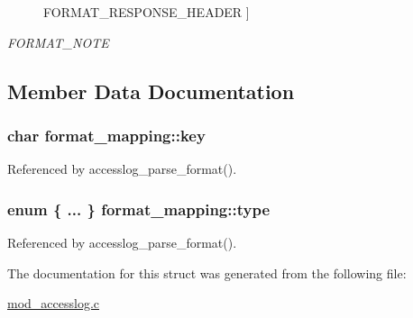 \begin{Desc}
\begin{description}
{\hypertarget{structformat__mapping_a64140d7a8e9af45156f6c4e81dabb506ab54f484250853187c8c5c251df0b1337}{F\-O\-R\-M\-A\-T\-\_\-\-R\-E\-S\-P\-O\-N\-S\-E\-\_\-\-H\-E\-A\-D\-E\-R}\label{structformat__mapping_a64140d7a8e9af45156f6c4e81dabb506ab54f484250853187c8c5c251df0b1337}
}]\item[{\em 
\hypertarget{structformat__mapping_a64140d7a8e9af45156f6c4e81dabb506a30d747e76b558e5fdcb36e90b52d3225}{F\-O\-R\-M\-A\-T\-\_\-\-N\-O\-T\-E}\label{structformat__mapping_a64140d7a8e9af45156f6c4e81dabb506a30d747e76b558e5fdcb36e90b52d3225}
}]\end{description}
\end{Desc}


\subsection{Member Data Documentation}
\hypertarget{structformat__mapping_ac83422062a85cba1360b399e195d379e}{
\subsubsection[{key}]{\setlength{\rightskip}{0pt plus 5cm}char format\-\_\-mapping\-::key}}\label{structformat__mapping_ac83422062a85cba1360b399e195d379e}


Referenced by accesslog\-\_\-parse\-\_\-format().

\hypertarget{structformat__mapping_a1aab006db73daa8daa3352cde804fcef}{
\subsubsection[{type}]{\setlength{\rightskip}{0pt plus 5cm}enum \{ ... \}   format\-\_\-mapping\-::type}}\label{structformat__mapping_a1aab006db73daa8daa3352cde804fcef}


Referenced by accesslog\-\_\-parse\-\_\-format().



The documentation for this struct was generated from the following file\-:\begin{DoxyCompactItemize}
\item 
\hyperlink{mod__accesslog_8c}{mod\-\_\-accesslog.\-c}\end{DoxyCompactItemize}

